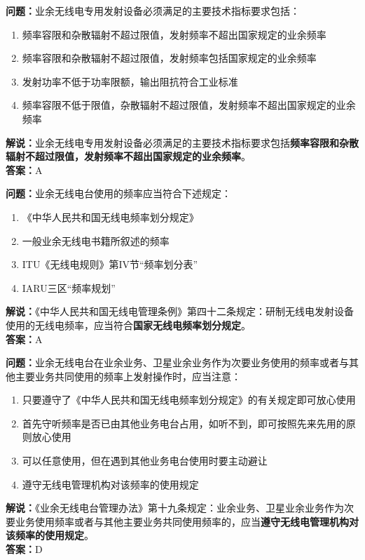 \bigskip


\noindent\textbf{问题：}业余无线电专用发射设备必须满足的主要技术指标要求包括：
\begin{enumerate}[label=\Alph*), leftmargin=3em]
	\item 频率容限和杂散辐射不超过限值，发射频率不超出国家规定的业余频率
	\item 频率容限和杂散辐射不超过限值，发射频率包括国家规定的业余频率
	\item 发射功率不低于功率限额，输出阻抗符合工业标准
	\item 频率容限不低于限值，杂散辐射不超过限值，发射频率不超出国家规定的业余频率
\end{enumerate}
\noindent\textbf{解说：}业余无线电专用发射设备必须满足的主要技术指标要求包括\textbf{频率容限和杂散辐射不超过限值，发射频率不超出国家规定的业余频率}。\\\noindent\textbf{答案：}A




\bigskip


\noindent\textbf{问题：}业余无线电台使用的频率应当符合下述规定：
\begin{enumerate}[label=\Alph*), leftmargin=3em]
	\item 《中华人民共和国无线电频率划分规定》
	\item 一般业余无线电书籍所叙述的频率
	\item ITU《无线电规则》第IV节“频率划分表”
	\item IARU三区“频率规划”
\end{enumerate}
\noindent\textbf{解说：}《中华人民共和国无线电管理条例》第四十二条规定：研制无线电发射设备使用的无线电频率，应当符合\textbf{国家无线电频率划分规定}。\\\noindent\textbf{答案：}A




\bigskip


\noindent\textbf{问题：}业余无线电台在业余业务、卫星业余业务作为次要业务使用的频率或者与其他主要业务共同使用的频率上发射操作时，应当注意：
\begin{enumerate}[label=\Alph*), leftmargin=3em]
	\item 只要遵守了《中华人民共和国无线电频率划分规定》的有关规定即可放心使用
	\item 首先守听频率是否已由其他业务电台占用，如听不到，即可按照先来先用的原则放心使用
	\item 可以任意使用，但在遇到其他业务电台使用时要主动避让
	\item 遵守无线电管理机构对该频率的使用规定
\end{enumerate}
\noindent\textbf{解说：}《业余无线电台管理办法》第十九条规定：业余业务、卫星业余业务作为次要业务使用频率或者与其他主要业务共同使用频率的，应当\textbf{遵守无线电管理机构对该频率的使用规定}。\\\noindent\textbf{答案：}D




